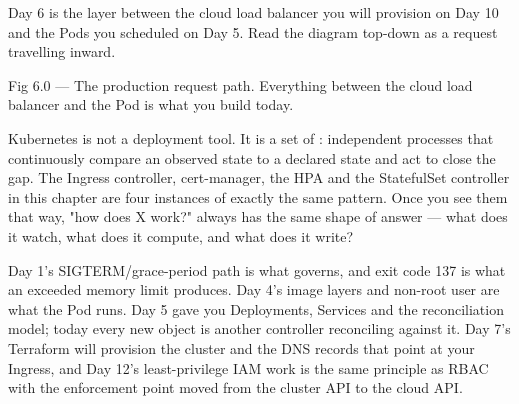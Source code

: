  Day 6 is the layer between the cloud load balancer you will provision on Day 10 and the Pods you scheduled on Day 5. Read the diagram top-down as a request travelling inward.

\begin{wbfigure}{Fig 6.0 — The production request path. Everything between the cloud load balancer and the Pod is what you build today.}
\end{wbfigure}

\begin{keyidea}
Kubernetes is not a deployment tool. It is a set of : independent processes that continuously compare an observed state to a declared state and act to close the gap. The Ingress controller, cert-manager, the HPA and the StatefulSet controller in this chapter are four instances of exactly the same pattern. Once you see them that way, "how does X work?" always has the same shape of answer --- what does it watch, what does it compute, and what does it write?
\end{keyidea}

 Day 1's SIGTERM/grace-period path is what  governs, and exit code 137 is what an exceeded memory limit produces. Day 4's image layers and non-root user are what the Pod runs. Day 5 gave you Deployments, Services and the reconciliation model; today every new object is another controller reconciling against it. Day 7's Terraform will provision the cluster and the DNS records that point at your Ingress, and Day 12's least-privilege IAM work is the same principle as RBAC with the enforcement point moved from the cluster API to the cloud API.

